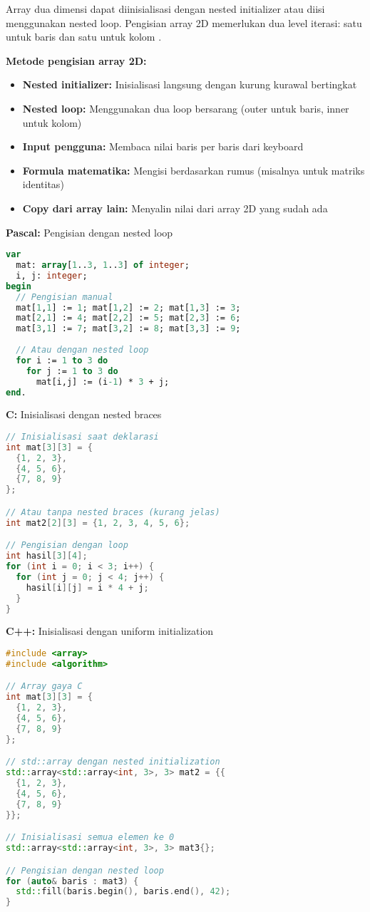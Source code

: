 \documentclass[../main.tex]{subfiles}
\begin{document}
Array dua dimensi dapat diinisialisasi dengan nested initializer atau diisi menggunakan nested loop. Pengisian array 2D memerlukan dua level iterasi: satu untuk baris dan satu untuk kolom \parencite{geeksforgeeks-2d-array,learncpp-multidimensional,duniailkom-cpp-2d-array}.

\textbf{Metode pengisian array 2D:}
\begin{itemize}
  \item \textbf{Nested initializer:} Inisialisasi langsung dengan kurung kurawal bertingkat
  \item \textbf{Nested loop:} Menggunakan dua loop bersarang (outer untuk baris, inner untuk kolom)
  \item \textbf{Input pengguna:} Membaca nilai baris per baris dari keyboard
  \item \textbf{Formula matematika:} Mengisi berdasarkan rumus (misalnya untuk matriks identitas)
  \item \textbf{Copy dari array lain:} Menyalin nilai dari array 2D yang sudah ada
\end{itemize}

\textbf{Pascal:} Pengisian dengan nested loop
\begin{lstlisting}[language=Pascal, caption={Inisialisasi array 2D di Pascal}]
var
  mat: array[1..3, 1..3] of integer;
  i, j: integer;
begin
  // Pengisian manual
  mat[1,1] := 1; mat[1,2] := 2; mat[1,3] := 3;
  mat[2,1] := 4; mat[2,2] := 5; mat[2,3] := 6;
  mat[3,1] := 7; mat[3,2] := 8; mat[3,3] := 9;
  
  // Atau dengan nested loop
  for i := 1 to 3 do
    for j := 1 to 3 do
      mat[i,j] := (i-1) * 3 + j;
end.
\end{lstlisting}

\textbf{C:} Inisialisasi dengan nested braces
\begin{lstlisting}[language=C, caption={Inisialisasi array 2D di C}]
// Inisialisasi saat deklarasi
int mat[3][3] = {
  {1, 2, 3},
  {4, 5, 6},
  {7, 8, 9}
};

// Atau tanpa nested braces (kurang jelas)
int mat2[2][3] = {1, 2, 3, 4, 5, 6};

// Pengisian dengan loop
int hasil[3][4];
for (int i = 0; i < 3; i++) {
  for (int j = 0; j < 4; j++) {
    hasil[i][j] = i * 4 + j;
  }
}
\end{lstlisting}

\textbf{C++:} Inisialisasi dengan uniform initialization
\begin{lstlisting}[language=C++, caption={Inisialisasi array 2D di C++}]
#include <array>
#include <algorithm>

// Array gaya C
int mat[3][3] = {
  {1, 2, 3},
  {4, 5, 6},
  {7, 8, 9}
};

// std::array dengan nested initialization
std::array<std::array<int, 3>, 3> mat2 = {{
  {1, 2, 3},
  {4, 5, 6},
  {7, 8, 9}
}};

// Inisialisasi semua elemen ke 0
std::array<std::array<int, 3>, 3> mat3{};

// Pengisian dengan nested loop
for (auto& baris : mat3) {
  std::fill(baris.begin(), baris.end(), 42);
}
\end{lstlisting}
\end{document}
